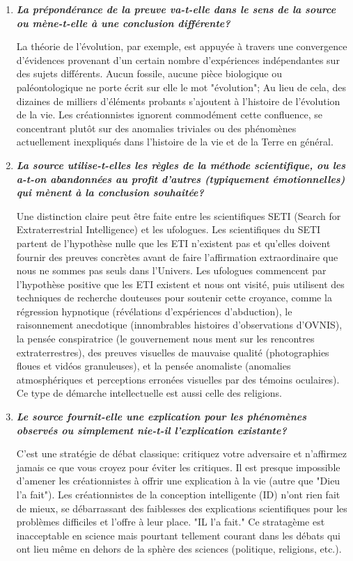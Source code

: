 \begin{enumerate}
		\item \textit{\textbf{La prépondérance de la preuve va-t-elle dans le sens de la source ou mène-t-elle à une conclusion différente?}}

		La théorie de l'évolution, par exemple, est appuyée à travers une convergence d'évidences provenant d'un certain nombre d'expériences indépendantes sur des sujets différents. Aucun fossile, aucune pièce biologique ou paléontologique ne porte écrit sur elle le mot "évolution"; Au lieu de cela, des dizaines de milliers d'éléments probants s'ajoutent à l'histoire de l'évolution de la vie. Les créationnistes ignorent commodément cette confluence, se concentrant plutôt sur des anomalies triviales ou des phénomènes actuellement inexpliqués dans l'histoire de la vie et de la Terre en général.

		\item \textit{\textbf{La source utilise-t-elles les règles de la méthode scientifique, ou les a-t-on abandonnées au profit d'autres (typiquement émotionnelles) qui mènent à la conclusion souhaitée?}} 

		Une distinction claire peut être faite entre les scientifiques SETI (Search for Extraterrestrial Intelligence) et les ufologues. Les scientifiques du SETI partent de l'hypothèse nulle que les ETI n'existent pas et qu'elles doivent fournir des preuves concrètes avant de faire l'affirmation extraordinaire que nous ne sommes pas seuls dans l'Univers. Les ufologues commencent par l'hypothèse positive que les ETI existent et nous ont visité, puis utilisent des techniques de recherche douteuses pour soutenir cette croyance, comme la régression hypnotique (révélations d'expériences d'abduction), le raisonnement anecdotique (innombrables histoires d'observations d'OVNIS), la pensée conspiratrice (le gouvernement nous ment sur les rencontres extraterrestres), des preuves visuelles de mauvaise qualité (photographies floues et vidéos granuleuses), et la pensée anomaliste (anomalies atmosphériques et perceptions erronées visuelles par des témoins oculaires). Ce type de démarche intellectuelle est aussi celle des religions.

		\item \textit{\textbf{Le source fournit-elle une explication pour les phénomènes observés ou simplement nie-t-il l'explication existante?}}
	
		C'est une stratégie de débat classique: critiquez votre adversaire et n'affirmez jamais ce que vous croyez pour éviter les critiques. Il est presque impossible d'amener les créationnistes à offrir une explication à la vie (autre que "Dieu l'a fait"). Les créationnistes de la conception intelligente (ID) n'ont rien fait de mieux, se débarrassant des faiblesses des explications scientifiques pour les problèmes difficiles et l'offre à leur place. "IL l'a fait." Ce stratagème est inacceptable en science mais pourtant tellement courant dans les débats qui ont lieu même en dehors de la sphère des sciences (politique, religions, etc.).


\end{enumerate}
